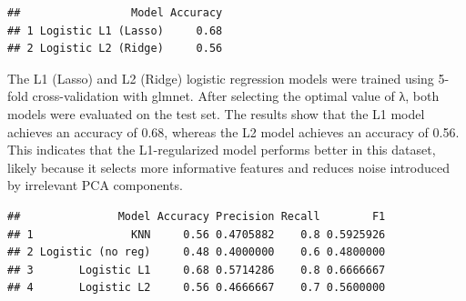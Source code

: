 \documentclass[
]{article}
\newenvironment{Shaded}{\begin{snugshade}}{\end{snugshade}}
\newcommand{\AttributeTok}[1]{\textcolor[rgb]{0.13,0.29,0.53}{#1}}
\newcommand{\ControlFlowTok}[1]{\textcolor[rgb]{0.13,0.29,0.53}{\textbf{#1}}}
\newcommand{\FunctionTok}[1]{\textcolor[rgb]{0.13,0.29,0.53}{\textbf{#1}}}
\newcommand{\NormalTok}[1]{#1}
\newcommand{\OtherTok}[1]{\textcolor[rgb]{0.56,0.35,0.01}{#1}}
\newcommand{\SpecialCharTok}[1]{\textcolor[rgb]{0.81,0.36,0.00}{\textbf{#1}}}
\newcommand{\StringTok}[1]{\textcolor[rgb]{0.31,0.60,0.02}{#1}}
\begin{document}
\begin{verbatim}
##                 Model Accuracy
## 1 Logistic L1 (Lasso)     0.68
## 2 Logistic L2 (Ridge)     0.56
\end{verbatim}

The L1 (Lasso) and L2 (Ridge) logistic regression models were trained
using 5-fold cross-validation with glmnet. After selecting the optimal
value of λ, both models were evaluated on the test set. The results show
that the L1 model achieves an accuracy of 0.68, whereas the L2 model
achieves an accuracy of 0.56. This indicates that the L1-regularized
model performs better in this dataset, likely because it selects more
informative features and reduces noise introduced by irrelevant PCA
components.

\begin{Shaded}
\end{Shaded}

\begin{verbatim}
##               Model Accuracy Precision Recall        F1
## 1               KNN     0.56 0.4705882    0.8 0.5925926
## 2 Logistic (no reg)     0.48 0.4000000    0.6 0.4800000
## 3       Logistic L1     0.68 0.5714286    0.8 0.6666667
## 4       Logistic L2     0.56 0.4666667    0.7 0.5600000
\end{verbatim}
\end{document}
